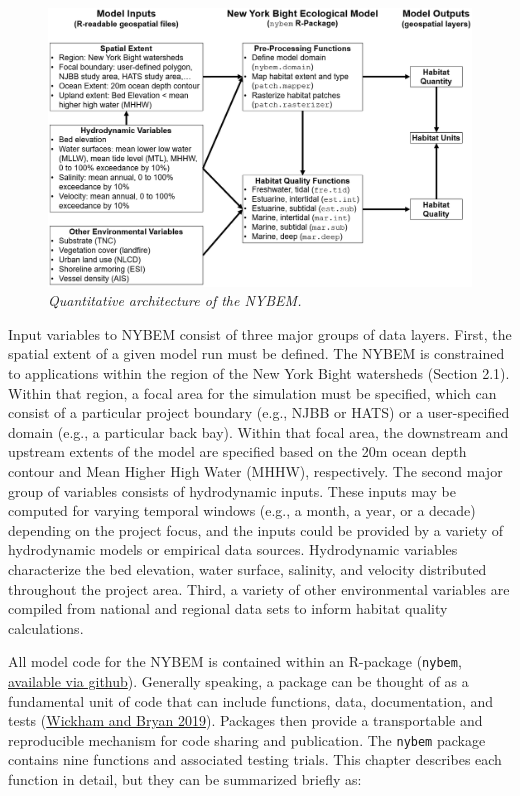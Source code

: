\documentclass[
]{book}
\begin{document}
\begin{figure}
\centering
\includegraphics{ZZ_Fig04_NYBEM.Architecture.png}
\caption{\emph{Quantitative architecture of the NYBEM.}}
\end{figure}

Input variables to NYBEM consist of three major groups of data layers. First, the spatial extent of a given model run must be defined. The NYBEM is constrained to applications within the region of the New York Bight watersheds (Section 2.1). Within that region, a focal area for the simulation must be specified, which can consist of a particular project boundary (e.g., NJBB or HATS) or a user-specified domain (e.g., a particular back bay). Within that focal area, the downstream and upstream extents of the model are specified based on the 20m ocean depth contour and Mean Higher High Water (MHHW), respectively. The second major group of variables consists of hydrodynamic inputs. These inputs may be computed for varying temporal windows (e.g., a month, a year, or a decade) depending on the project focus, and the inputs could be provided by a variety of hydrodynamic models or empirical data sources. Hydrodynamic variables characterize the bed elevation, water surface, salinity, and velocity distributed throughout the project area. Third, a variety of other environmental variables are compiled from national and regional data sets to inform habitat quality calculations.

All model code for the NYBEM is contained within an R-package (\texttt{nybem}, \href{https://github.com/MVR-GIS}{available via github}). Generally speaking, a package can be thought of as a fundamental unit of code that can include functions, data, documentation, and tests (\href{https://r-pkgs.org/}{Wickham and Bryan 2019}). Packages then provide a transportable and reproducible mechanism for code sharing and publication. The \texttt{nybem} package contains nine functions and associated testing trials. This chapter describes each function in detail, but they can be summarized briefly as:
\end{document}
